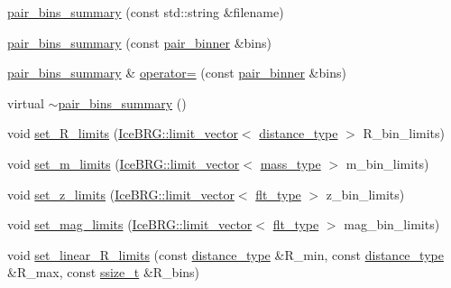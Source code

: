 \begin{DoxyCompactItemize}
\item 
\hyperlink{classIceBRG_1_1pair__bins__summary_a082924adf96c1604f88e73b5b3bcc87d}{pair\-\_\-bins\-\_\-summary} (const std\-::string \&filename)
\item 
\hyperlink{classIceBRG_1_1pair__bins__summary_aa031c76c0717dd77232f44fae2cb8bdd}{pair\-\_\-bins\-\_\-summary} (const \hyperlink{classIceBRG_1_1pair__binner}{pair\-\_\-binner} \&bins)
\item 
\hyperlink{classIceBRG_1_1pair__bins__summary}{pair\-\_\-bins\-\_\-summary} \& \hyperlink{classIceBRG_1_1pair__bins__summary_af1d9f93977eb8f7b17e397933a71f70c}{operator=} (const \hyperlink{classIceBRG_1_1pair__binner}{pair\-\_\-binner} \&bins)
\item 
virtual \hyperlink{classIceBRG_1_1pair__bins__summary_a20297356c0eea3b163c3f68fd9e001eb}{$\sim$pair\-\_\-bins\-\_\-summary} ()
\item 
void \hyperlink{classIceBRG_1_1pair__bins__summary_a8a65637499aead61fecf9dc057158a55}{set\-\_\-\-R\-\_\-limits} (\hyperlink{classIceBRG_1_1limit__vector}{Ice\-B\-R\-G\-::limit\-\_\-vector}$<$ \hyperlink{namespaceIceBRG_a45499647eb87e24c10ab32c628711cec}{distance\-\_\-type} $>$ R\-\_\-bin\-\_\-limits)
\item 
void \hyperlink{classIceBRG_1_1pair__bins__summary_a01a6131459f8f68a5d704c46885fcc9b}{set\-\_\-m\-\_\-limits} (\hyperlink{classIceBRG_1_1limit__vector}{Ice\-B\-R\-G\-::limit\-\_\-vector}$<$ \hyperlink{namespaceIceBRG_a1be72ac4918a9b029f2eefa084213e35}{mass\-\_\-type} $>$ m\-\_\-bin\-\_\-limits)
\item 
void \hyperlink{classIceBRG_1_1pair__bins__summary_a6625df1c0eb2c288e9e5b62d2222a3ca}{set\-\_\-z\-\_\-limits} (\hyperlink{classIceBRG_1_1limit__vector}{Ice\-B\-R\-G\-::limit\-\_\-vector}$<$ \hyperlink{lib_2IceBRG__main_2common_8h_ad0f130a56eeb944d9ef2692ee881ecc4}{flt\-\_\-type} $>$ z\-\_\-bin\-\_\-limits)
\item 
void \hyperlink{classIceBRG_1_1pair__bins__summary_a21c1b01b73f7b86666afd9f54e72b145}{set\-\_\-mag\-\_\-limits} (\hyperlink{classIceBRG_1_1limit__vector}{Ice\-B\-R\-G\-::limit\-\_\-vector}$<$ \hyperlink{lib_2IceBRG__main_2common_8h_ad0f130a56eeb944d9ef2692ee881ecc4}{flt\-\_\-type} $>$ mag\-\_\-bin\-\_\-limits)
\item 
void \hyperlink{classIceBRG_1_1pair__bins__summary_a664ff45e62edaef88f333fdbfcfe52af}{set\-\_\-linear\-\_\-\-R\-\_\-limits} (const \hyperlink{namespaceIceBRG_a45499647eb87e24c10ab32c628711cec}{distance\-\_\-type} \&R\-\_\-min, const \hyperlink{namespaceIceBRG_a45499647eb87e24c10ab32c628711cec}{distance\-\_\-type} \&R\-\_\-max, const \hyperlink{lib_2IceBRG__main_2common_8h_ab322a3e50421dc5f0c43316b1b373592}{ssize\-\_\-t} \&R\-\_\-bins)

\end{DoxyCompactItemize}
